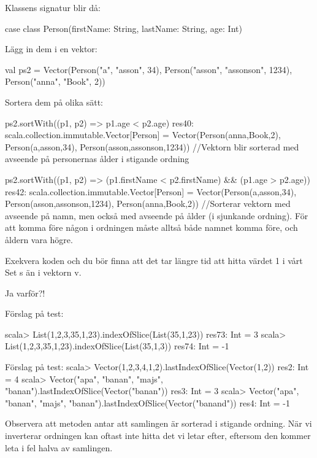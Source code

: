 \Subtask
Klassens signatur blir då:
\begin{REPLnonum}
case class Person(firstName: String, lastName: String, age: Int)
\end{REPLnonum}

Lägg in dem i en vektor: 
\begin{REPLnonum}
val ps2 = Vector(Person("a", "asson", 34), Person("asson", "assonson", 1234), Person("anna", "Book", 2))
\end{REPLnonum}

Sortera dem på olika sätt:
\begin{REPLnonum}
ps2.sortWith((p1, p2) => p1.age < p2.age)
res40: scala.collection.immutable.Vector[Person] = Vector(Person(anna,Book,2), Person(a,asson,34), Person(asson,assonson,1234))
//Vektorn blir sorterad med avseende på personernas ålder i stigande ordning

ps2.sortWith((p1, p2) => (p1.firstName < p2.firstName) && (p1.age > p2.age))
res42: scala.collection.immutable.Vector[Person] = Vector(Person(a,asson,34), Person(asson,assonson,1234), Person(anna,Book,2))
//Sorterar vektorn med avseende på namn, men också med avseende på ålder (i sjunkande ordning). För att komma före någon i ordningen måste alltså både namnet komma före, och åldern vara högre.
\end{REPLnonum}

\Task %

\Subtask Exekvera koden och du bör finna att det tar längre tid att hitta värdet 1 i vårt Set s än i vektorn v.

\Subtask Ja varför?!


\Task %

\Subtask
Förslag på test:
\begin{REPLnonum}
scala> List(1,2,3,35,1,23).indexOfSlice(List(35,1,23))
res73: Int = 3
scala> List(1,2,3,35,1,23).indexOfSlice(List(35,1,3))
res74: Int = -1
\end{REPLnonum}

\Subtask
\begin{REPLnonum}
Förslag på test:
scala> Vector(1,2,3,4,1,2).lastIndexOfSlice(Vector(1,2))
res2: Int = 4
scala> Vector("apa", "banan", "majs", "banan").lastIndexOfSlice(Vector("banan"))
res3: Int = 3
scala> Vector("apa", "banan", "majs", "banan").lastIndexOfSlice(Vector("banand"))
res4: Int = -1
\end{REPLnonum}

\Subtask
Observera att metoden  antar att samlingen är sorterad i stigande ordning. När vi inverterar ordningen kan  oftast inte hitta det vi letar efter, eftersom den kommer leta i fel halva av samlingen.

